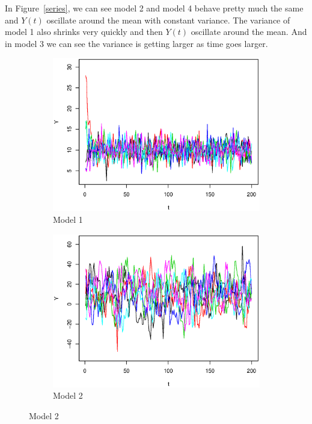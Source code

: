\documentclass{article}
\begin{document}
In Figure~\ref{series}, we can see model 2 and model 4 behave pretty much the same and $Y(t)$ oscillate around the mean with constant variance. The variance of model 1 also shrinks very quickly and then $Y(t)$ oscillate around the mean. And in model 3 we can see the variance is getting larger as time goes larger.  
\begin{figure}[!htb]
     \centering
 	\begin{subfigure}[b]{0.45\textwidth}
 	\includegraphics[width = \textwidth]{Model1.eps}
 	\caption{Model 1}
 	\end{subfigure}%
 	\begin{subfigure}[b]{0.45\textwidth}
 	\includegraphics[width = \textwidth]{Model2.eps}
 	\caption{Model 2}
 	\end{subfigure}%

\end{figure}
\end{document}
